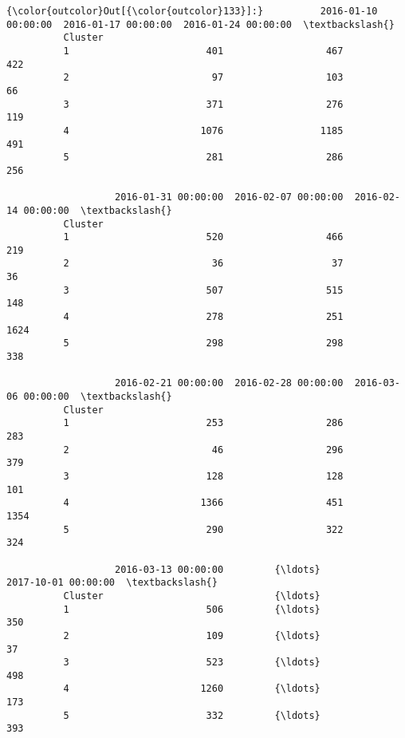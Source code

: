 \documentclass[11pt]{article}
\begin{document}
\begin{Verbatim}[commandchars=\\\{\}]
{\color{outcolor}Out[{\color{outcolor}133}]:}          2016-01-10 00:00:00  2016-01-17 00:00:00  2016-01-24 00:00:00  \textbackslash{}
          Cluster                                                                  
          1                        401                  467                  422   
          2                         97                  103                   66   
          3                        371                  276                  119   
          4                       1076                 1185                  491   
          5                        281                  286                  256   
          
                   2016-01-31 00:00:00  2016-02-07 00:00:00  2016-02-14 00:00:00  \textbackslash{}
          Cluster                                                                  
          1                        520                  466                  219   
          2                         36                   37                   36   
          3                        507                  515                  148   
          4                        278                  251                 1624   
          5                        298                  298                  338   
          
                   2016-02-21 00:00:00  2016-02-28 00:00:00  2016-03-06 00:00:00  \textbackslash{}
          Cluster                                                                  
          1                        253                  286                  283   
          2                         46                  296                  379   
          3                        128                  128                  101   
          4                       1366                  451                 1354   
          5                        290                  322                  324   
          
                   2016-03-13 00:00:00         {\ldots}           2017-10-01 00:00:00  \textbackslash{}
          Cluster                              {\ldots}                                 
          1                        506         {\ldots}                           350   
          2                        109         {\ldots}                            37   
          3                        523         {\ldots}                           498   
          4                       1260         {\ldots}                           173   
          5                        332         {\ldots}                           393   
          

\end{Verbatim}
\end{document}
